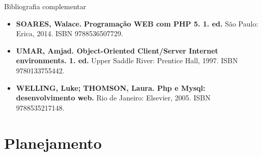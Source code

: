 \documentclass{beamer}
\begin{document}
\begin{frame}{Bibliografia complementar}
      \begin{itemize}
            \item \textbf{SOARES, Walace.} \textbf{\textcolor{sintefdarkgreen}{Programação WEB com PHP 5. 1. ed.}} São Paulo: Erica, 2014. ISBN 9788536507729.
            \item \textbf{UMAR, Amjad. \textcolor{sintefdarkgreen}{Object-Oriented Client/Server Internet environments. 1. ed.}} Upper Saddle River: Prentice Hall, 1997. ISBN 9780133755442.
            \item \textbf{WELLING, Luke; THOMSON, Laura. \textcolor{sintefdarkgreen}{Php e Mysql: desenvolvimento web.}} Rio de Janeiro: Elsevier, 2005. ISBN 9788535217148.

      \end{itemize}
\end{frame}

\section{Planejamento}
\end{document}
